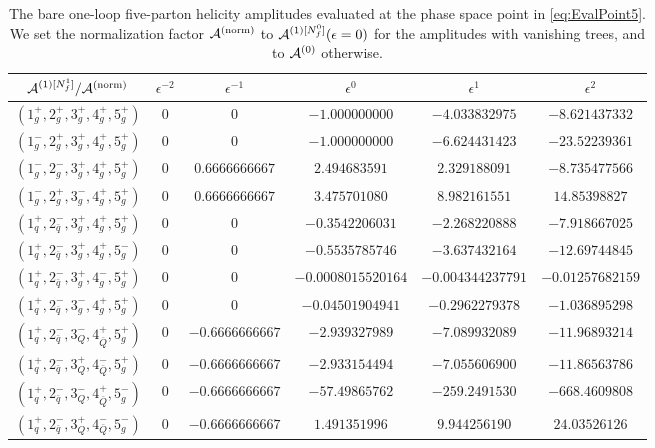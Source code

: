 \begin{table}[h]
\begin{adjustbox}{width=1\textwidth}
\begin{tabular}{cccccc}
      $\mathcal{A}^{(1)[N_f^1]}/\mathcal{A}^\mathrm{(norm)}$   &   $\epsilon^{-2}$   &   $\epsilon^{-1}$   &   $\epsilon^{0}$   &   $\epsilon^{1}$  &  $\epsilon^{2}$ \\
      \midrule
      $(1_g^+,2_g^+,3_g^+,4_g^+,5_g^+)$ & $0$ & $0$ &
      $-1.000000000$ & $-4.033832975$ & $-8.621437332$ \\
      $(1_g^-,2_g^+,3_g^+,4_g^+,5_g^+)$ & $0$ & $0$ &
      $-1.000000000$ & $-6.624431423$ & $-23.52239361$ \\
      $(1_g^-,2_g^-,3_g^+,4_g^+,5_g^+)$ &  $0$ & $0.6666666667$ &
      $2.494683591$ & $2.329188091$ & $-8.735477566$ \\
      $(1_g^-,2_g^+,3_g^-,4_g^+,5_g^+)$ &  $0$ & $0.6666666667$ &
      $3.475701080$ &  $8.982161551$ &  $14.85398827$ \\
      \midrule
      $(1_q^+,2_{\bar q}^-,3_g^+,4_g^+,5_g^+)$ & $0$ & $0$ &
      $-0.3542206031$ & $-2.268220888$ & $-7.918667025$ \\
      $(1_q^+,2_{\bar q}^-,3_g^+,4_g^+,5_g^-)$ & $0$ & $0$ &
      $-0.5535785746$ & $-3.637432164$ & $-12.69744845$ \\
      $(1_q^+,2_{\bar q}^-,3_g^+,4_g^-,5_g^+)$ & $0$ & $0$ &
      $-0.0008015520164$ & $-0.004344237791$ & $-0.01257682159$
      \\
      $(1_q^+,2_{\bar q}^-,3_g^-,4_g^+,5_g^+)$ & $0$ & $0$ &
      $-0.04501904941$ & $-0.2962279378$ & $-1.036895298$ \\
      \midrule
      $(1_q^+,2_{\bar q}^-,3_Q^-,4_{\bar Q}^+,5_g^+)$ & $0$ &
      $-0.6666666667$ & $-2.939327989$ & $-7.089932089$ &
      $-11.96893214$ 
      \\
      $(1_q^+,2_{\bar q}^-,3_Q^+,4_{\bar Q}^-,5_g^+)$ & $0$ &
      $-0.6666666667$ & $-2.933154494$ & $-7.055606900$ &
      $-11.86563786$ 
      \\
      $(1_q^+,2_{\bar q}^-,3_Q^-,4_{\bar Q}^+,5_g^-)$ & $0$ &
      $-0.6666666667$ & $-57.49865762$ & $-259.2491530$ &
      $-668.4609808$
      \\
      $(1_q^+,2_{\bar q}^-,3_Q^+,4_{\bar Q}^-,5_g^-)$ & $0$ &
      $-0.6666666667$ & $1.491351996$ & $9.944256190$ & 
      $24.03526126$ \\
      \bottomrule
    \end{tabular}
  \end{adjustbox}
  \caption{The bare one-loop five-parton helicity amplitudes 
  evaluated at the phase space point in \cref{eq:EvalPoint5}. We set the
    normalization factor $\mathcal{A}^\mathrm{(norm)}$ to $\mathcal{A}^{(1)[N_f^0]}(\epsilon=0)$ for the
    amplitudes with vanishing trees, and to $\mathcal{A}^{(0)}$ otherwise.}
  \label{tab:results5parton1L}
\end{table}

